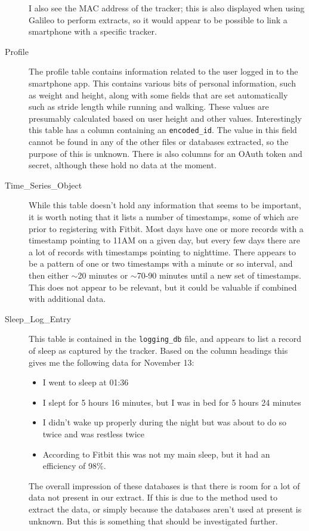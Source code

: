 \documentclass[a4paper,11pt,dvips]{article}
\begin{document}
\begin{description}
I also see the MAC address of the tracker; this is also displayed when using Galileo to perform extracts, so it would appear to be possible to link a smartphone with a specific tracker.
\item [Profile] The profile table contains information related to the user logged in to the smartphone app. This contains various bits of personal information, such as weight and height, along with some fields that are set automatically such as stride length while running and walking. These values are presumably calculated based on user height and other values. Interestingly this table has a column containing an \texttt{encoded\_id}. The value in this field cannot be found in any of the other files or databases extracted, so the purpose of this is unknown. There is also columns for an OAuth token and secret, although these hold no data at the moment.
\item [Time\_Series\_Object] While this table doesn't hold any information that seems to be important, it is worth noting that it lists a number of timestamps, some of which are prior to registering with Fitbit. Most days have one or more records with a timestamp pointing to 11AM on a given day, but every few days there are a lot of records with timestamps pointing to nighttime. There appears to be a pattern of one or two timestamps with a minute or so interval, and then either $\sim$20 minutes or $\sim$70-90 minutes until a new set of timestamps. This does not appear to be relevant, but it could be valuable if combined with additional data.
\item [Sleep\_Log\_Entry] This table is contained in the \texttt{logging\_db} file, and appears to list a record of sleep as captured by the tracker. Based on the column headings this gives me the following data for November 13:
\begin{itemize}
\item I went to sleep at 01:36
\item I slept for 5 hours 16 minutes, but I was in bed for 5 hours 24 minutes
\item I didn't wake up properly during the night but was about to do so twice and was restless twice
\item According to Fitbit this was not my main sleep, but it had an efficiency of 98\%.
\end{itemize}
The overall impression of these databases is that there is room for a lot of data not present in our extract. If this is due to the method used to extract the data, or simply because the databases aren't used at present is unknown. But this is something that should be investigated further.
\end{description}
\end{document}
